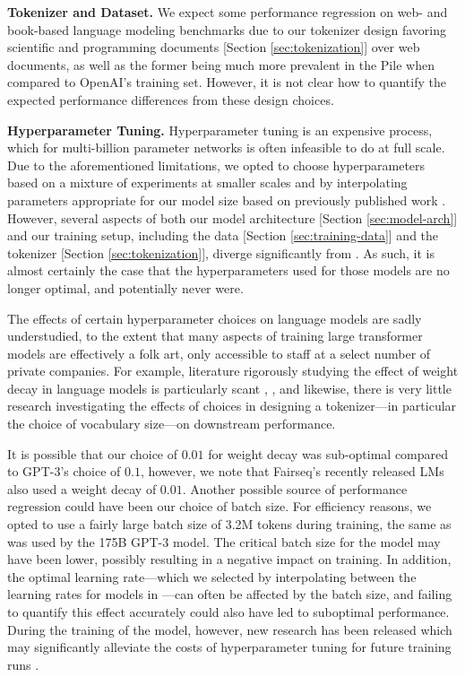 \documentclass{article}
\begin{document}
\textbf{Tokenizer and Dataset.} We expect some performance regression on web- and book-based language modeling benchmarks due to our tokenizer design favoring scientific and programming documents [Section \ref{sec:tokenization}] over web documents, as well as the former being much more prevalent in the Pile when compared to OpenAI's training set. However, it is not clear how to quantify the expected performance differences from these design choices.

\textbf{Hyperparameter Tuning.} Hyperparameter tuning is an expensive process, which for multi-billion parameter networks is often infeasible to do at full scale. Due to the aforementioned limitations, we opted to choose hyperparameters based on a mixture of experiments at smaller scales and by interpolating parameters appropriate for our model size based on previously published work \citep{brown2020language}. However, several aspects of both our model architecture [Section \ref{sec:model-arch}] and our training setup, including the data [Section \ref{sec:training-data}] and the tokenizer [Section \ref{sec:tokenization}], diverge significantly from \citet{brown2020language}. As such, it is almost certainly the case that the hyperparameters used for those models are no longer optimal, and potentially never were. 

The effects of certain hyperparameter choices on language models are sadly understudied, to the extent that many aspects of training large transformer models are effectively a folk art, only accessible to staff at a select number of private companies. For example, literature rigorously studying the effect of weight decay in language models is particularly scant \citep{fixnorm}, \citep{wd-reg}, and likewise, there is very little research investigating the effects of choices in designing a tokenizer---in particular the choice of vocabulary size---on downstream performance. 

It is possible that our choice of $0.01$ for weight decay was sub-optimal compared to GPT-3's choice of $0.1$, however, we note that Fairseq's recently released LMs \citep{fairseq-13B} also used a weight decay of $0.01$. Another possible source of performance regression could have been our choice of batch size. For efficiency reasons, we opted to use a fairly large batch size of 3.2M tokens during training, the same as was used by the 175B GPT-3 model. The critical batch size \citep{large-batch-training} for the model may have been lower, possibly resulting in a negative impact on training. In addition, the optimal learning rate---which we selected by interpolating between the learning rates for models in \citep{brown2020language}---can often be affected by the batch size, and failing to quantify this effect accurately could also have led to suboptimal performance. During the training of the model, however, new research has been released which may significantly alleviate the costs of hyperparameter tuning for future training runs \citep{yang2021tuning}.
\end{document}
